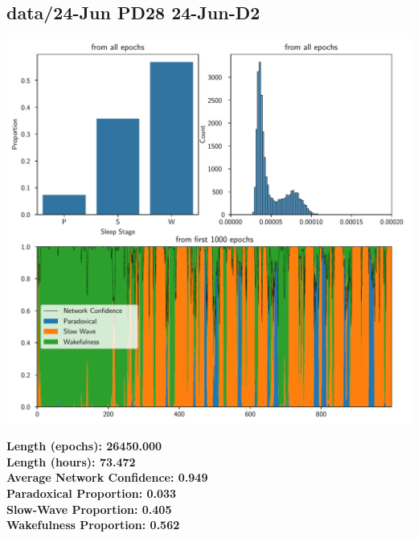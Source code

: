         \subsection*{ data/24-Jun PD28 24-Jun-D2 }
        \begin{center}
        \begin{adjustbox}{width=1\textwidth}
        \includegraphics[page=7]{figs.pdf}
        \end{adjustbox}
        \end{center}
        \large\textbf{Length (epochs): 26450.000}\\
        \textbf{Length (hours): 73.472}\\
        \textbf{Average Network Confidence: 0.949}\\
        \textbf{Paradoxical Proportion: 0.033}\\
        \textbf{Slow-Wave Proportion: 0.405}\\
        \textbf{Wakefulness Proportion: 0.562}\\
        
